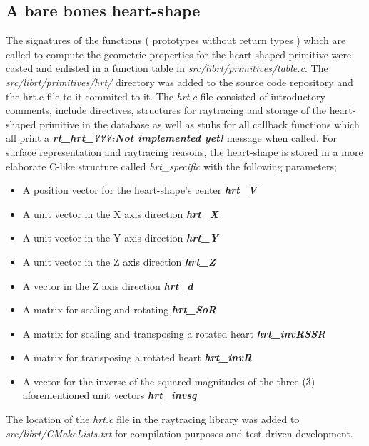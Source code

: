 \subsection{A bare bones heart­-shape}

The signatures of the functions ( prototypes without return types ) which   are   called   to   compute   the  
geometric   properties   for   the   heart-­shaped   primitive   were   casted   and   enlisted   in  
a   function   table   in   \textit{src/librt/primitives/table.c}. The \textit{src/librt/primitives/hrt/}
 directory was added to the source code repository   and  the   hrt.c   file   to   it commited to it. 
The   \textit{hrt.c}   file   consisted   of   introductory   comments,   include  directives,
 structures   for   raytracing   and   storage   of   the   heart­-shaped   primitive   in   the  
database   as   well   as   stubs   for   all   callback   functions   which   all   print   a  
\textit{\textbf{\“rt\_hrt\_???:Not   implemented   yet!\”}}   message   when   called.   For   surface  
representation   and   raytracing   reasons,   the   heart-­shape   is   stored   in   a   more  
elaborate C-­like structure called \textit{hrt\_specific} with the following parameters;  

\begin{itemize}
\item A position vector for the heart-shape's center \textbf{\textit{hrt\_V}}  
\item A unit vector in the X ­axis direction \textbf{\textit{hrt\_X}}  
\item A unit vector in the Y axis direction \textbf{\textit{hrt\_Y}}  
\item A unit vector in the Z axis direction \textbf{\textit{hrt\_Z}}  
\item A vector in the Z ­axis direction \textit{\textbf{hrt\_d}}  
\item A matrix for scaling and rotating \textit{\textbf{hrt\_SoR}}  
\item A matrix for scaling and transposing a rotated heart \textbf{\textit{hrt\_invRSSR}}  
\item A matrix for transposing a rotated heart \textit{\textbf{hrt\_invR}}  
\item A vector for the inverse of the squared magnitudes of the three (3) aforementioned unit vectors \textit{\textbf{hrt\_invsq}}  
\end{itemize}

The   location   of   the   \textit{hrt.c}   file   in   the   raytracing   library   was   added   to  
\textit{src/librt/CMakeLists.txt} for compilation purposes and test ­driven development.
   
